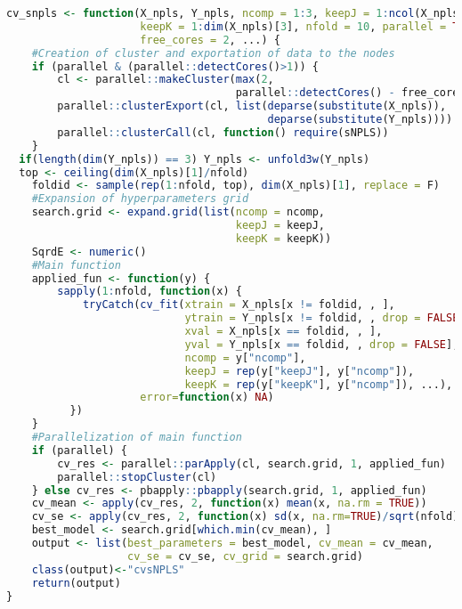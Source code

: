 \begin{scriptsize}
\begin{lstlisting}[language=R, deletekeywords={scale, !=, <-, !, Q, qf, names, max, var, drop, se, search.grid, mean, grid, search}, otherkeywords={}, morekeywords={unfold3w}, caption=Cross validation function]
cv_snpls <- function(X_npls, Y_npls, ncomp = 1:3, keepJ = 1:ncol(X_npls),
                     keepK = 1:dim(X_npls)[3], nfold = 10, parallel = TRUE, 
                     free_cores = 2, ...) {
    #Creation of cluster and exportation of data to the nodes
    if (parallel & (parallel::detectCores()>1)) {
        cl <- parallel::makeCluster(max(2, 
                                    parallel::detectCores() - free_cores))
        parallel::clusterExport(cl, list(deparse(substitute(X_npls)),
                                         deparse(substitute(Y_npls))))
        parallel::clusterCall(cl, function() require(sNPLS))
    }
  if(length(dim(Y_npls)) == 3) Y_npls <- unfold3w(Y_npls)
  top <- ceiling(dim(X_npls)[1]/nfold)
    foldid <- sample(rep(1:nfold, top), dim(X_npls)[1], replace = F)
    #Expansion of hyperparameters grid
    search.grid <- expand.grid(list(ncomp = ncomp, 
                                    keepJ = keepJ, 
                                    keepK = keepK))
    SqrdE <- numeric()
    #Main function
    applied_fun <- function(y) {
        sapply(1:nfold, function(x) {
            tryCatch(cv_fit(xtrain = X_npls[x != foldid, , ],
                            ytrain = Y_npls[x != foldid, , drop = FALSE],
                            xval = X_npls[x == foldid, , ],
                            yval = Y_npls[x == foldid, , drop = FALSE],
                            ncomp = y["ncomp"],
                            keepJ = rep(y["keepJ"], y["ncomp"]),
                            keepK = rep(y["keepK"], y["ncomp"]), ...),
                     error=function(x) NA)
          })
    }
    #Parallelization of main function
    if (parallel) {
        cv_res <- parallel::parApply(cl, search.grid, 1, applied_fun)
        parallel::stopCluster(cl)
    } else cv_res <- pbapply::pbapply(search.grid, 1, applied_fun)
    cv_mean <- apply(cv_res, 2, function(x) mean(x, na.rm = TRUE))
    cv_se <- apply(cv_res, 2, function(x) sd(x, na.rm=TRUE)/sqrt(nfold))
    best_model <- search.grid[which.min(cv_mean), ]
    output <- list(best_parameters = best_model, cv_mean = cv_mean,
                   cv_se = cv_se, cv_grid = search.grid)
    class(output)<-"cvsNPLS"
    return(output)
}
\end{lstlisting}
\end{scriptsize}

